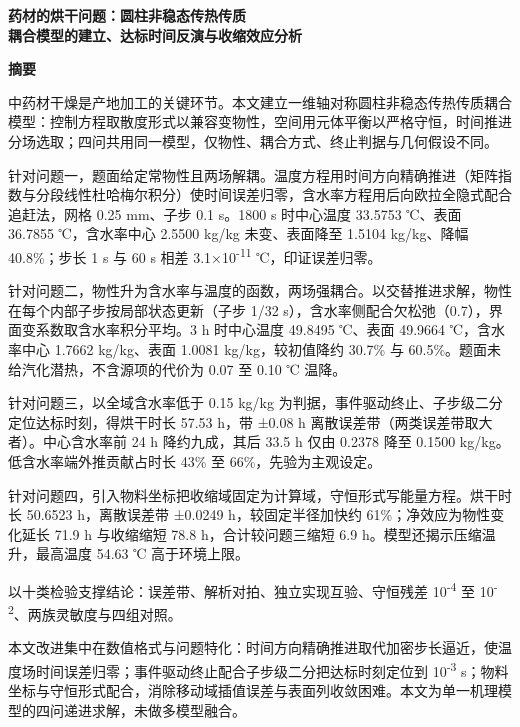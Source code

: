 \thispagestyle{plain}
{\linespread{1.25}\selectfont
\begin{center}
  {\bfseries 药材的烘干问题：圆柱非稳态传热传质\\耦合模型的建立、达标时间反演与收缩效应分析}
\end{center}

\vspace{0.4em}
\begin{center}\bfseries 摘要\end{center}

\vspace{0.2em}

中药材干燥是产地加工的关键环节。本文建立一维轴对称圆柱非稳态传热传质耦合模型：控制方程取散度形式以兼容变物性，空间用元体平衡以严格守恒，时间推进分场选取；四问共用同一模型，仅物性、耦合方式、终止判据与几何假设不同。

针对问题一，题面给定常物性且两场解耦。温度方程用时间方向精确推进（矩阵指数与分段线性杜哈梅尔积分）使时间误差归零，含水率方程用后向欧拉全隐式配合追赶法，网格 0.25 mm、子步 0.1 s。1800 s 时中心温度 33.5753 ℃、表面 36.7855 ℃，含水率中心 2.5500 kg/kg 未变、表面降至 1.5104 kg/kg、降幅 40.8\%；步长 1 s 与 60 s 相差 3.1×10\textsuperscript{-11} ℃，印证误差归零。

针对问题二，物性升为含水率与温度的函数，两场强耦合。以交替推进求解，物性在每个内部子步按局部状态更新（子步 1/32 s），含水率侧配合欠松弛（0.7），界面变系数取含水率积分平均。3 h 时中心温度 49.8495 ℃、表面 49.9664 ℃，含水率中心 1.7662 kg/kg、表面 1.0081 kg/kg，较初值降约 30.7\% 与 60.5\%。题面未给汽化潜热，不含源项的代价为 0.07 至 0.10 ℃ 温降。

针对问题三，以全域含水率低于 0.15 kg/kg 为判据，事件驱动终止、子步级二分定位达标时刻，得烘干时长 57.53 h，带 ±0.08 h 离散误差带（两类误差带取大者）。中心含水率前 24 h 降约九成，其后 33.5 h 仅由 0.2378 降至 0.1500 kg/kg。低含水率端外推贡献占时长 43\% 至 66\%，先验为主观设定。

针对问题四，引入物料坐标把收缩域固定为计算域，守恒形式写能量方程。烘干时长 50.6523 h，离散误差带 ±0.0249 h，较固定半径加快约 61\%；净效应为物性变化延长 71.9 h 与收缩缩短 78.8 h，合计较问题三缩短 6.9 h。模型还揭示压缩温升，最高温度 54.63 ℃ 高于环境上限。

以十类检验支撑结论：误差带、解析对拍、独立实现互验、守恒残差 10\textsuperscript{-4} 至 10\textsuperscript{-2}、两族灵敏度与四组对照。

本文改进集中在数值格式与问题特化：时间方向精确推进取代加密步长逼近，使温度场时间误差归零；事件驱动终止配合子步级二分把达标时刻定位到 10\textsuperscript{-3} s；物料坐标与守恒形式配合，消除移动域插值误差与表面列收敛困难。本文为单一机理模型的四问递进求解，未做多模型融合。

}

\clearpage
